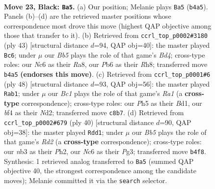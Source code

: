 \documentclass[11pt]{article}
\begin{document}
\clearpage

\begin{figure}[p]\centering
\begin{subfigure}{0.46\textwidth}\centering
\resizebox{\linewidth}{!}{%
\newchessgame
\chessboard[
  setfen={r1b4r/5k2/ppn1p1p1/4Pp1p/nbB2B2/PN3NP1/1P3P1P/RK1R4 b - - 0 23},
  showmover=false,
  pgfstyle=straightmove, color=movearrow, markmove={b4-a5}
]}
\caption{}
\end{subfigure}\hfill
\begin{subfigure}{0.46\textwidth}\centering
\resizebox{\linewidth}{!}{%
\newchessgame
\chessboard[
  setfen={r4k1r/pp3pp1/5n1p/2Pb3P/1n2pN1B/6P1/3RPPB1/4K2R b K - 5 22},
  showmover=false,
  pgfstyle=straightmove, color=movearrow, markmove={d5-c6}
]}
\caption{}
\end{subfigure}
\\[4pt]
\begin{subfigure}{0.46\textwidth}\centering
\resizebox{\linewidth}{!}{%
\newchessgame
\chessboard[
  setfen={2rb2k1/nRNb1p2/4pn1p/r2p2p1/P1pP4/2P1P2P/3N1PPB/R2B2K1 w - - 5 25},
  showmover=false,
  pgfstyle=straightmove, color=movearrow, markmove={a1-b1}
]}
\caption{}
\end{subfigure}\hfill
\begin{subfigure}{0.46\textwidth}\centering
\resizebox{\linewidth}{!}{%
\newchessgame
\chessboard[
  setfen={r2r2k1/pb3pp1/1p3n1p/2b5/2N1pB2/1P4P1/P2RPPBP/2R3K1 w - - 2 21},
  showmover=false,
  pgfstyle=straightmove, color=movearrow, markmove={d2-d1}
]}
\caption{}
\end{subfigure}
\caption{\textbf{Move 23, Black: \texttt{Ba5}.} (a) Our position; Melanie plays \texttt{Ba5} (\texttt{b4a5}). Panels (b)--(d) are the retrieved master positions whose correspondence most drove this move (highest QAP objective among those that transfer to it). (b) Retrieved from \texttt{ccrl\_top\_p0002\#3180} (ply 43) [structural distance $d$=94, QAP obj=40]: the master played \texttt{Bc6}; under $\mu$ our \emph{Bb5} plays the role of that game's \emph{Bd4}; cross-type roles: our \emph{N}c6 as their \emph{R}a8, our \emph{P}b6 as their \emph{R}h8; transferred move \texttt{b4a5} \textbf{(endorses this move)}. (c) Retrieved from \texttt{ccrl\_top\_p0001\#6} (ply 48) [structural distance $d$=93, QAP obj=56]: the master played \texttt{Rab1}; under $\mu$ our \emph{Bc1} plays the role of that game's \emph{Ra1} (a \textbf{cross-type} correspondence); cross-type roles: our \emph{P}h5 as their \emph{B}d1, our \emph{b}f4 as their \emph{N}d2; transferred move \texttt{c8b7}. (d) Retrieved from \texttt{ccrl\_top\_p0002\#679} (ply 40) [structural distance $d$=90, QAP obj=38]: the master played \texttt{Rdd1}; under $\mu$ our \emph{Bb5} plays the role of that game's \emph{Rd2} (a \textbf{cross-type} correspondence); cross-type roles: our \emph{n}b3 as their \emph{P}h2, our \emph{N}c6 as their \emph{P}g3; transferred move \texttt{b4f8}. Synthesis: 1 retrieved analog transferred to \texttt{Ba5} (summed QAP objective 40, the strongest correspondence among the candidate moves); Melanie committed it via the \texttt{search} selector.}
\label{fig:thought-m45}
\end{figure}
\end{document}
